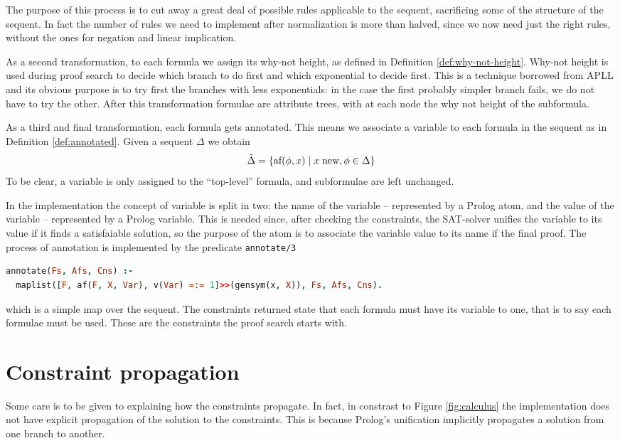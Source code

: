 \documentclass[a4paper, 12pt, tesi, english]{report}
\begin{document}
The purpose of this process is to cut away a great deal of possible rules applicable to the sequent, sacrificing some of the structure of the sequent.
In fact the number of rules we need to implement after normalization is more than halved, since we now need just the right rules, without the ones for negation and linear implication.

As a second transformation, to each formula we assign its why-not height, as defined in Definition \ref{def:why-not-height}.
Why-not height is used during proof search to decide which branch to do first and which exponential to decide first.
This is a technique borrowed from APLL and its obvious purpose is to try first the branches with less exponentials: in the case the first probably simpler branch fails, we do not have to try the other.
After this transformation formulae are attribute trees, with at each node the why not height of the subformula.

As a third and final transformation, each formula gets annotated.
This means we associate a variable to each formula in the sequent as in Definition \ref{def:annotated}.
Given a sequent $\Delta$ we obtain
$$ \hat{\Delta} = \{ \text{af}(\phi, x) \mid x \; \text{new}, \phi \in \Delta \} $$
To be clear, a variable is only assigned to the ``top-level'' formula, and subformulae are left unchanged.

In the implementation the concept of variable is split in two: the name of the variable -- represented by a Prolog atom, and the value of the variable -- represented by a Prolog variable.
This is needed since, after checking the constraints, the SAT-solver unifies the variable to its value if it finds a satisfaiable solution, so the purpose of the atom is to associate the variable value to its name if the final proof.
The process of annotation is implemented by the predicate \texttt{annotate/3}
\begin{lstlisting}[language=prolog]
%! annotate(+[Formulae], -[AFs], -[Constraints]) is det.
annotate(Fs, Afs, Cns) :-
  maplist([F, af(F, X, Var), v(Var) =:= 1]>>(gensym(x, X)), Fs, Afs, Cns).
\end{lstlisting}
which is a simple map over the sequent.
The constraints returned state that each formula must have its variable to one, that is to say each formulae must be used.
These are the constraints the proof search starts with.

\section{Constraint propagation}
Some care is to be given to explaining how the constraints propagate.
In fact, in constrast to Figure \ref{fig:calculus} the implementation does not have explicit propagation of the solution to the constraints.
This is because Prolog's unification implicitly propagates a solution from one branch to another.
\end{document}
